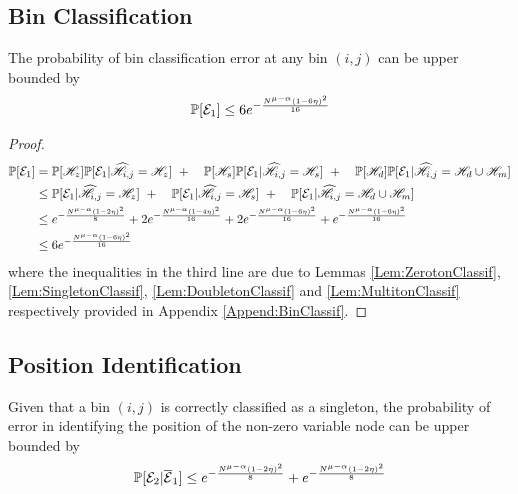 \documentclass[journal,11pt,onecolumn]{IEEEtran}  %
\begin{document}
\subsection{\bf Bin Classification}
\begin{lemma}
The probability of bin classification error at any bin $(i,j)$ can be upper bounded by
\begin{align*}
\mathbb{P}[\mathcal{E}_1]\leq 6e^{-\frac{N^{\mu-\alpha}(1-6\eta)^2}{16}}
\end{align*}
\end{lemma}

\begin{proof}
\begin{align*}
\mathbb{P}[\mathcal{E}_1]&=\mathbb{P}[\mathscr{H}_z]\mathbb{P}[\mathcal{E}_1|\widehat{\mathscr{H}}_{i,j}=\mathscr{H}_z]~+
						\quad \mathbb{P}[\mathscr{H}_s]\mathbb{P}[\mathcal{E}_1|\widehat{\mathscr{H}}_{i,j}=\mathscr{H}_s]~+
						\quad\mathbb{P}[\mathscr{H}_d]\mathbb{P}[\mathcal{E}_1|\widehat{\mathscr{H}}_{i,j}=\mathscr{H}_d \cup \mathscr{H}_m]\\
				&\leq \mathbb{P}[\mathcal{E}_1|\widehat{\mathscr{H}}_{i,j}=\mathscr{H}_z]~+
						\quad \mathbb{P}[\mathcal{E}_1|\widehat{\mathscr{H}}_{i,j}=\mathscr{H}_s]~+
						\quad \mathbb{P}[\mathcal{E}_1|\widehat{\mathscr{H}}_{i,j}=\mathscr{H}_d \cup \mathscr{H}_m]\\
    			&\leq  e^{-\frac{N^{\mu-\alpha}(1-2\eta)^2}{8}}+2e^{-\frac{N^{\mu-\alpha}(1-4\eta)^2}{16}}+ 2e^{-\frac{N^{\mu-\alpha}(1-6\eta)^2}{16}}+e^{-\frac{N^{\mu-\alpha}(1-6\eta)^2}{16}}\\
    			&\leq 6e^{-\frac{N^{\mu-\alpha}(1-6\eta)^2}{16}}\\
						\end{align*}
						where the inequalities in the third line are due to Lemmas \ref{Lem:ZerotonClassif}, \ref{Lem:SingletonClassif}, \ref{Lem:DoubletonClassif} and \ref{Lem:MultitonClassif} respectively provided in Appendix \ref{Append:BinClassif}.
\end{proof}

\subsection{\bf Position Identification}
\begin{lemma}
Given that a bin $(i,j)$ is correctly classified as a singleton, the probability of error in identifying the position of the non-zero variable node can be upper bounded by
\begin{align*}
\mathbb{P}[\mathcal{E}_2|\overline{\mathcal{E}}_1]\leq e^{-\frac{N^{\mu-\alpha}(1-2\eta)^2}{8}}+e^{-\frac{N^{\mu-\alpha}(1-2\eta)^2}{8}}
\end{align*}
\end{lemma}
\end{document}
